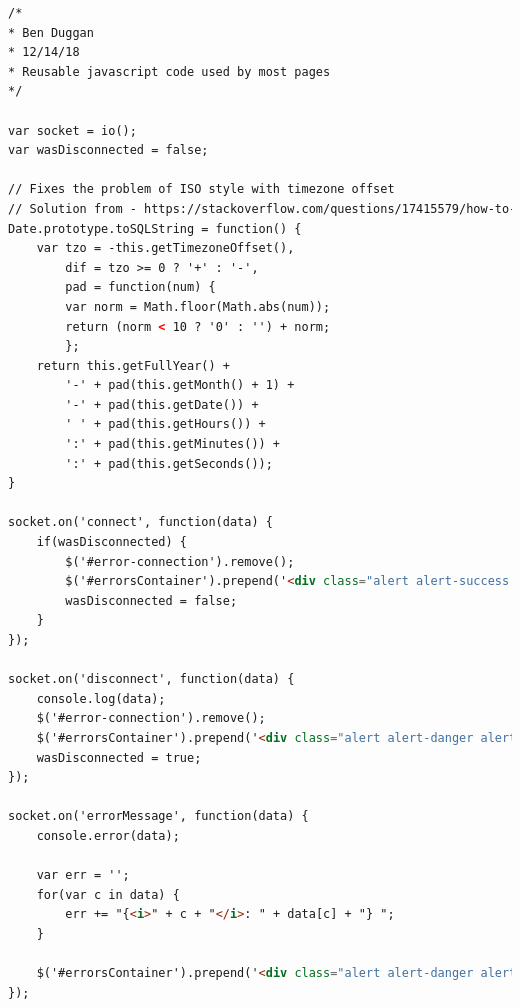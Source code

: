 \documentclass[12pt]{article}
\begin{document}
\begin{lstlisting}[language=html, caption="main.js", breaklines=true]
/*
* Ben Duggan
* 12/14/18
* Reusable javascript code used by most pages
*/

var socket = io();
var wasDisconnected = false;

// Fixes the problem of ISO style with timezone offset
// Solution from - https://stackoverflow.com/questions/17415579/how-to-iso-8601-format-a-date-with-timezone-offset-in-javascript
Date.prototype.toSQLString = function() {
	var tzo = -this.getTimezoneOffset(),
		dif = tzo >= 0 ? '+' : '-',
		pad = function(num) {
		var norm = Math.floor(Math.abs(num));
		return (norm < 10 ? '0' : '') + norm;
		};
	return this.getFullYear() +
		'-' + pad(this.getMonth() + 1) +
		'-' + pad(this.getDate()) +
		' ' + pad(this.getHours()) +
		':' + pad(this.getMinutes()) +
		':' + pad(this.getSeconds());
}

socket.on('connect', function(data) {
	if(wasDisconnected) {
		$('#error-connection').remove();
		$('#errorsContainer').prepend('<div class="alert alert-success alert-dismissible fade show" id="error-connection" role="alert"><strong>Connected to the server. </strong><button type="button" class="close" data-dismiss="alert" aria-label="Close"><span aria-hidden="true">&times;</span></button></div>');
		wasDisconnected = false;
	}
});

socket.on('disconnect', function(data) {
	console.log(data);
	$('#error-connection').remove();
	$('#errorsContainer').prepend('<div class="alert alert-danger alert-dismissible fade show" id="error-connection" role="alert"><strong>Disconnected from the server. </strong>The server might have crashed.  This means that no data is being saved.  Try refreshing and if nothing appears, restart the server.<button type="button" class="close" data-dismiss="alert" aria-label="Close"><span aria-hidden="true">&times;</span></button></div>');
	wasDisconnected = true;
});

socket.on('errorMessage', function(data) {
	console.error(data);
	
	var err = '';
	for(var c in data) {
		err += "{<i>" + c + "</i>: " + data[c] + "} ";
	}
	
	$('#errorsContainer').prepend('<div class="alert alert-danger alert-dismissible fade show" role="alert"><strong>An error occured on the server: </strong>'+err+'<button type="button" class="close" data-dismiss="alert" aria-label="Close"><span aria-hidden="true">&times;</span></button></div>');
});
\end{lstlisting}
\end{document}
